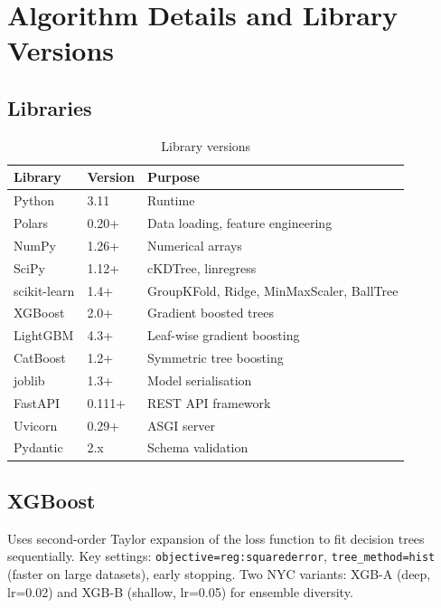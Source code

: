 \documentclass[11pt, a4paper, twoside]{report}
\begin{document}
\chapter{Algorithm Details and Library Versions}
\label{ch:algorithms}

\section{Libraries}
\begin{table}[H]
  \centering
  \caption{Library versions}
  \begin{tabular}{lll}
    \toprule
    Library & Version & Purpose \\
    \midrule
    Python       & 3.11   & Runtime \\
    Polars       & 0.20+  & Data loading, feature engineering \\
    NumPy        & 1.26+  & Numerical arrays \\
    SciPy        & 1.12+  & cKDTree, linregress \\
    scikit-learn & 1.4+   & GroupKFold, Ridge, MinMaxScaler, BallTree \\
    XGBoost      & 2.0+   & Gradient boosted trees \\
    LightGBM     & 4.3+   & Leaf-wise gradient boosting \\
    CatBoost     & 1.2+   & Symmetric tree boosting \\
    joblib       & 1.3+   & Model serialisation \\
    FastAPI      & 0.111+ & REST API framework \\
    Uvicorn      & 0.29+  & ASGI server \\
    Pydantic     & 2.x    & Schema validation \\
    \bottomrule
  \end{tabular}
\end{table}

\section{XGBoost}
Uses second-order Taylor expansion of the loss function to fit decision trees
sequentially. Key settings: \texttt{objective=reg:squarederror},
\texttt{tree\_method=hist} (faster on large datasets), early stopping.
Two NYC variants: XGB-A (deep, lr=0.02) and XGB-B (shallow, lr=0.05) for
ensemble diversity.
\end{document}
